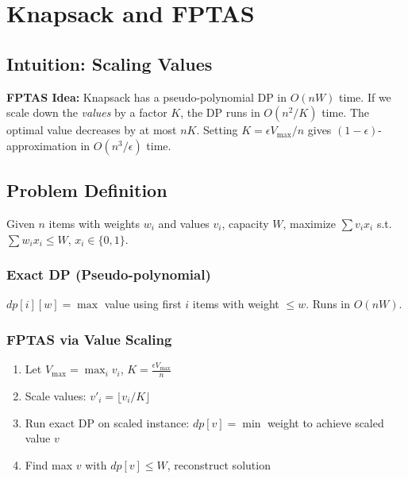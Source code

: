 \chapter{Knapsack and FPTAS}
\label{ch:knapsack}

\section{Intuition: Scaling Values}

\begin{intuitionbox}
\textbf{FPTAS Idea:} Knapsack has a pseudo-polynomial DP in $O(nW)$ time. If we scale down the \emph{values} by a factor $K$, the DP runs in $O(n^2/K)$ time. The optimal value decreases by at most $nK$. Setting $K = \epsilon V_{\max}/n$ gives $(1-\epsilon)$-approximation in $O(n^3/\epsilon)$ time.
\end{intuitionbox}

\section{Problem Definition}

\begin{definition}[0/1 Knapsack]
Given $n$ items with weights $w_i$ and values $v_i$, capacity $W$, maximize $\sum v_i x_i$ s.t. $\sum w_i x_i \leq W$, $x_i \in \{0,1\}$.
\end{definition}

\subsection{Exact DP (Pseudo-polynomial)}

$dp[i][w] = \max$ value using first $i$ items with weight $\leq w$. Runs in $O(nW)$.

\subsection{FPTAS via Value Scaling}

\begin{algorithmdef}
\begin{enumerate}
    \item Let $V_{\max} = \max_i v_i$, $K = \frac{\epsilon V_{\max}}{n}$
    \item Scale values: $v'_i = \lfloor v_i / K \rfloor$
    \item Run exact DP on scaled instance: $dp[v] = \min$ weight to achieve scaled value $v$
    \item Find max $v$ with $dp[v] \leq W$, reconstruct solution
\end{enumerate}
\end{algorithmdef}

